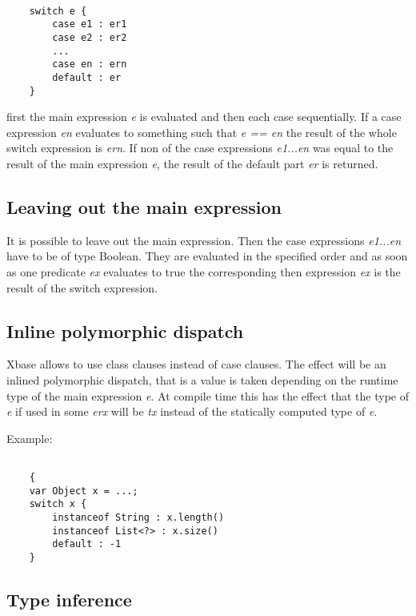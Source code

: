 \documentclass[a4paper,10pt]{scrreprt}
\begin{document}
\begin{lstlisting}

	switch e {
		case e1 : er1
		case e2 : er2
		...
		case en : ern
		default : er
	}

\end{lstlisting}


first the main expression \emph{e} is evaluated and then each case sequentially. 
If a case expression \emph{en} evaluates to something such that \emph{e == en} the result of the whole switch expression is \emph{ern}. If non of the 
case expressions \emph{e1...en} was equal to the result of the main expression \emph{e}, the result of the default part \emph{er} is returned.




\subsection{ Leaving out the main expression }

It is possible to leave out the main expression. Then the case expressions \emph{e1...en} have to be of type Boolean. They are evaluated 
in the specified order and as soon as one predicate \emph{ex} evaluates to true the corresponding then expression \emph{ex} is the result of the switch expression.




\subsection{ Inline polymorphic dispatch }

Xbase allows to use class clauses instead of case clauses. The effect will be an inlined polymorphic dispatch, that is a value is taken depending on the runtime type of the main 
expression  \emph{e}. At compile time this has the effect that the type of \emph{e} if used in some \emph{erx} will be \emph{tx} instead of the statically computed type of \emph{e}. 

Example:

\begin{lstlisting}

	{
	var Object x = ...;
	switch x {
		instanceof String : x.length()
		instanceof List<?> : x.size()
		default : -1
	}

\end{lstlisting}





\subsection{ Type inference }
\end{document}
